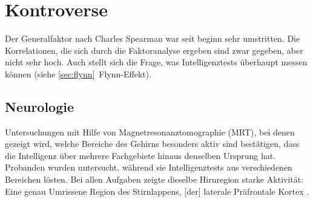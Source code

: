 \cite{wiki_intheorie}

\section{Kontroverse}
Der Generalfaktor nach Charles Spearman war seit beginn sehr umstritten. Die Korrelationen, die sich durch die Faktoranalyse ergeben sind zwar gegeben, aber nicht sehr hoch. Auch stellt sich die Frage, was Intelligenztests überhaupt messen können (siehe \ref{sec:flynn}~Flynn-Effekt).


\subsection{Neurologie}
Untersuchungen mit Hilfe von Magnetresonanztomographie (MRT), bei denen gezeigt wird, welche Bereiche des Gehirns besonders aktiv sind bestätigen, dass die Intelligenz über mehrere Fachgebiete hinaus denselben Ursprung hat.
Probanden wurden untersucht, während sie Intelligenztests aus verschiedenen Bereichen lösten. Bei allen Aufgaben zeigte dieselbe Hirnregion starke Aktivität: Eine \glqq genau Umrissene Region des Stirnlappens, [der] laterale Präfrontale Kortex \grqq{} \cite{geok15}.
